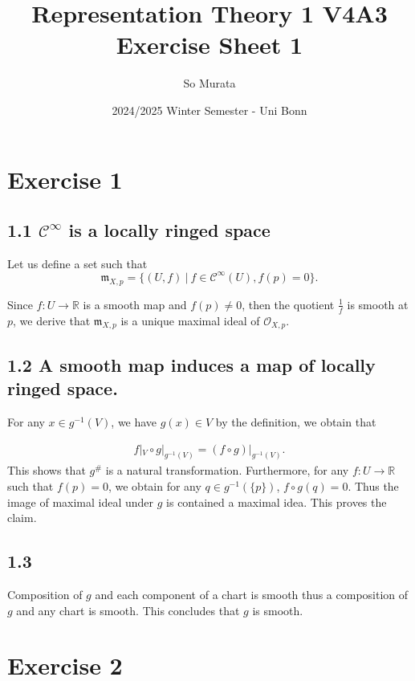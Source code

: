 \documentclass{article}
\title{Representation Theory 1 V4A3 Exercise Sheet 1}
\author{So Murata}
\date{2024/2025 Winter Semester - Uni Bonn}
\numberwithin{equation}{section}
\begin{document}
\maketitle

\section*{Exercise 1}

\subsection*{1.1 $\mathcal{C}^\infty$ is a locally ringed space}

Let us define a set such that 
\begin{equation*}
\mathfrak{m}_{X,p}=\{(U,f)\:|\: f\in\mathcal{C}^\infty(U), f(p)=0\}.
\end{equation*}

Since $f:U\to\mathbb{R}$ is a smooth map and $f(p)\not=0$, then the quotient ${\frac 1 f}$ is smooth at $p$, we derive that $\mathfrak{m}_{X,p}$ is a unique maximal ideal of $\mathcal{O}_{X,p}$.

\subsection*{1.2 A smooth map induces a map of locally ringed space.}

For any $x\in g^{-1}(V)$, we have $g(x)\in V$ by the definition, we obtain that

\begin{align*}
f|_V\circ g|_{g^{-1}(V)} = (f\circ g)|_{g^{-1}(V)}.
\end{align*}
This shows that $g^{\#}$ is a natural transformation. Furthermore, for any $f:U\to\mathbb{R}$ such that $f(p) = 0$, we obtain for any $q\in g^{-1}(\{p\})$, $f\circ g(q)=0$. Thus the image of maximal ideal under $g$ is contained a maximal idea. This proves the claim.

\subsection*{1.3}

Composition of $g$ and each component of a chart is smooth thus a composition of $g$ and any chart is smooth. This concludes that $g$ is smooth.

\section*{Exercise 2}
\end{document}
